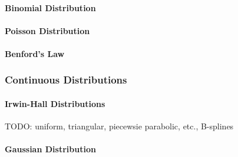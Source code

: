 

\paragraph{Binomial Distribution}


\paragraph{Poisson Distribution}


\paragraph{Benford's Law}



\subsubsection{Continuous Distributions}

\paragraph{Irwin-Hall Distributions} TODO: uniform, triangular, piecewsie parabolic, etc., B-splines

\paragraph{Gaussian Distribution}




